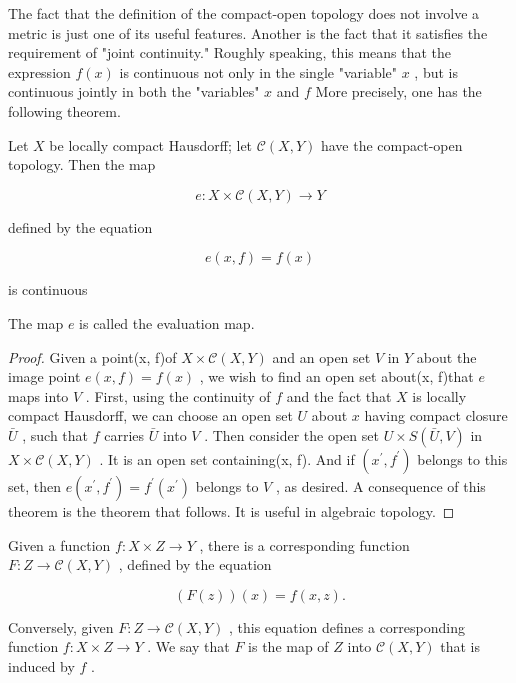 The fact that the definition of the compact-open topology does not involve a metric is just one of its useful features. Another is the fact that it satisfies the requirement of "joint continuity." Roughly speaking, this means that the expression \(f\left( x\right)\) is continuous not only in the single "variable" \(x\) , but is continuous jointly in both the "variables" \(x\) and \(f\) More precisely, one has the following theorem.

\begin{theorem} Let \(X\) be locally compact Hausdorff; let \(\mathcal{C}\left( {X,Y}\right)\) have the compact-open topology. Then the map

\[
e : X \times  \mathcal{C}\left( {X,Y}\right)  \rightarrow  Y
\]

defined by the equation

\[
e\left( {x,f}\right)  = f\left( x\right)
\]

is continuous

The map \(e\) is called the evaluation map.
\end{theorem}

\begin{proof}Given a point(x, f)of \(X \times  \mathcal{C}\left( {X,Y}\right)\) and an open set \(V\) in \(Y\) about the image point \(e\left( {x,f}\right)  = f\left( x\right)\) , we wish to find an open set about(x, f)that \(e\) maps into \(V\) . First, using the continuity of \(f\) and the fact that \(X\) is locally compact Hausdorff, we can choose an open set \(U\) about \(x\) having compact closure \(\bar{U}\) , such that \(f\) carries \(\bar{U}\) into \(V\) . Then consider the open set \(U \times  S\left( {\bar{U},V}\right)\) in \(X \times  \mathcal{C}\left( {X,Y}\right)\) . It is an open set containing(x, f). And if \(\left( {{x}^{\prime },{f}^{\prime }}\right)\) belongs to this set, then \(e\left( {{x}^{\prime },{f}^{\prime }}\right)  = {f}^{\prime }\left( {x}^{\prime }\right)\) belongs to \(V\) , as desired.
A consequence of this theorem is the theorem that follows. It is useful in algebraic topology.
\end{proof}
\begin{definition} Given a function \(f : X \times  Z \rightarrow  Y\) , there is a corresponding function \(F : Z \rightarrow  \mathcal{C}\left( {X,Y}\right)\) , defined by the equation

\[
\left( {F\left( z\right) }\right) \left( x\right)  = f\left( {x,z}\right) .
\]

Conversely, given \(F : Z \rightarrow  \mathcal{C}\left( {X,Y}\right)\) , this equation defines a corresponding function \(f : X \times  Z \rightarrow  Y\) . We say that \(F\) is the map of \(Z\) into \(\mathcal{C}\left( {X,Y}\right)\) that is induced by \(f\) .
\end{definition}

